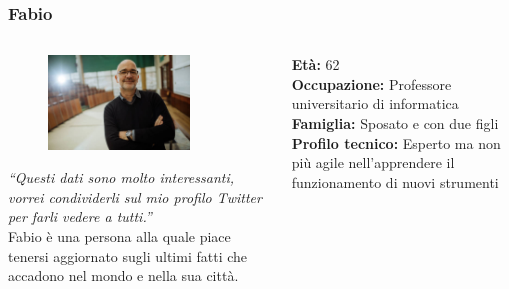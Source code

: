 \documentclass[handout]{beamer}
\begin{document}
		\begin{frame}
			\frametitle{Fabio}
			\begin{columns}[t]
				\begin{column}[T]{5cm}
					\begin{figure}
						\centering
						\vspace{-10pt}
						\includegraphics[height=2.5cm]{img/fabio}
					\end{figure}
					\vspace{-10pt}

					\textit{``Questi dati sono molto interessanti, vorrei condividerli sul mio profilo Twitter per farli vedere a tutti.''}\\
					Fabio è una persona alla quale piace tenersi aggiornato sugli ultimi fatti che accadono nel mondo e nella sua città.
				\end{column}
				\begin{column}[T]{5cm}
					\textbf{Età:} 62\\
					\textbf{Occupazione:} Professore universitario di informatica\\
					\textbf{Famiglia:} Sposato e con due figli\\
					\textbf{Profilo tecnico:} Esperto ma non più agile nell'apprendere il funzionamento di nuovi strumenti\\
				\end{column}
			\end{columns}
		\end{frame}
\end{document}
